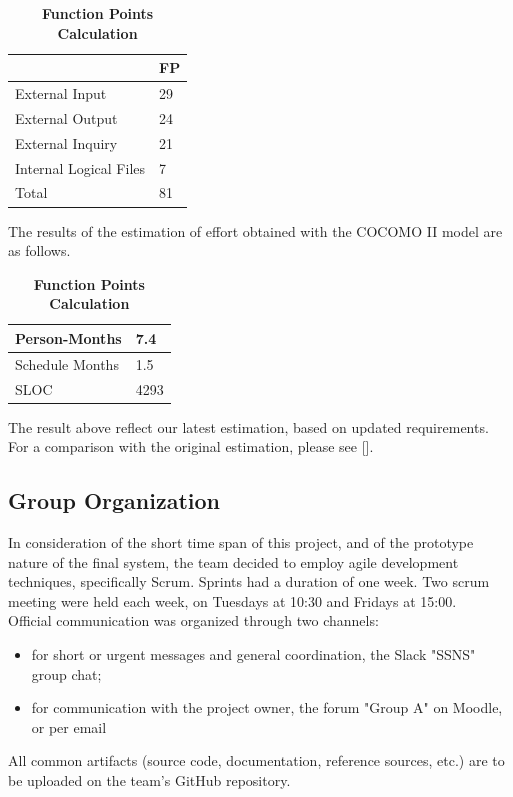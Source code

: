 \documentclass[conference,12pt]{IEEETran}
\begin{document}
\FloatBarrier
\begin{table}[h]
	\centering
	\caption{\textbf{Function Points Calculation}}
	{\renewcommand{\arraystretch}{2}%
		\begin{tabular}{|l|p{1cm}|}
			\hline
			 & FP \\
			\hline
			External Input & 29 \\
			\hline
		    External Output & 24 \\
		    \hline 
			External Inquiry & 21 \\
			\hline
			Internal Logical Files & 7 \\
			\hline
			Total & 81 \\
			\hline
	\end{tabular}}
\end{table}
\FloatBarrier

The results of the estimation of effort obtained with the COCOMO II model are as follows.

\FloatBarrier
\begin{table}[h]
	\centering
	\caption{\textbf{Function Points Calculation}}
	{\renewcommand{\arraystretch}{2}%
		\begin{tabular}{|l|p{1cm}|}
			\hline
			Person-Months & 7.4 \\
			\hline
			Schedule Months & 1.5 \\
			\hline
			SLOC & 4293 \\
			\hline 
	\end{tabular}}
\end{table}
\FloatBarrier
The result above reflect our latest estimation, based on updated requirements. For a comparison with the original estimation, please see [].

\subsection{Group Organization}

In consideration of the short time span of this project, and of the prototype nature of the final system, the team decided to employ agile development techniques, specifically Scrum. Sprints had a duration of one week. Two scrum meeting were held each week, on Tuesdays at 10:30 and Fridays at 15:00.\\
Official communication was organized through two channels:
\begin{itemize}
	\item for short or urgent messages and general coordination, the Slack "SSNS" group chat;
	\item for communication with the project owner, the forum "Group A" on Moodle, or per email
\end{itemize}
All common artifacts (source code, documentation, reference sources, etc.) are to be uploaded on the team’s GitHub repository.
\end{document}

